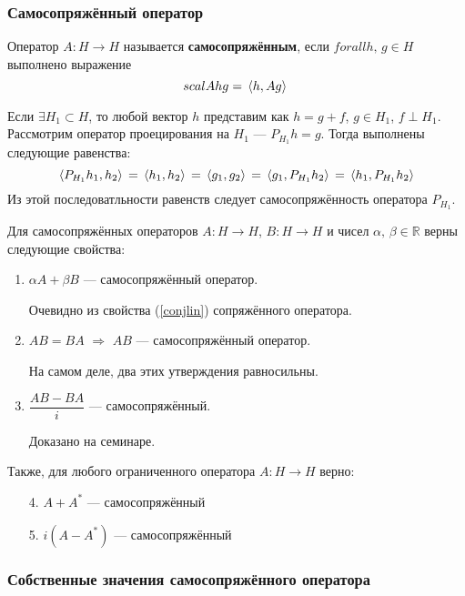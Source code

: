 \documentclass[12pt]{article}
\begin{document}
	\subsubsection{Самосопряжённый оператор}
	
	\begin{defi}
		Оператор $A : H \rightarrow H$ называется \textbf{самосопряжённым}, если $forall h,\, g \in H$ выполнено выражение
		$$scal{Ah}{g} = \, \langle h, Ag \rangle \,$$
	\end{defi}
	
	\example Если $\exists H_1 \subset H$, то любой вектор $h$ представим как $h = g+f$, $g \in H_1$, $f\perp H_1$.
	Рассмотрим оператор проецирования на $H_1$ --- $P_{H_1}h = g$. Тогда выполнены следующие равенства:
	$$\, \langle P_{H_1}h_1, h_2 \rangle \, = \, \langle h_1, h_2 \rangle \, = \, \langle g_1, g_2 \rangle \, = \, \langle g_1, P_{H_1}h_2 \rangle \, = \, \langle h_1, P_{H_1}h_2 \rangle \,$$
	Из этой последоватльности равенств следует самосопряжённость оператора $P_{H_1}$.
	
	Для самосопряжённых операторов $A : H \rightarrow H$, $B : H \rightarrow H$ и чисел $\alpha,\, \beta \in \mathbb{R}$ верны следующие
	свойства:
	\begin{enumerate}
		\item $\alpha A + \beta B$ --- самосопряжённый оператор.

		Очевидно из свойства (\ref{conjlin}) сопряжённого оператора.
		
		\item $AB = BA$ $\Rightarrow$ $AB$ --- самосопряжённый оператор.
		

		На самом деле, два этих утверждения равносильны.
		
		\item $\dfrac{AB - BA}{i}$ --- самосопряжённый.
		
		{\color{gray}
		Доказано на семинаре.
		}
	\end{enumerate}
	Также, для любого ограниченного оператора $A: H \rightarrow H$ верно:
	\begin{enumerate}
		\item[4.] $A+A^{*}$ --- самосопряжённый
		\item[5.] $i(A-A^{*})$ --- самосопряжённый
	\end{enumerate}
	
	\subsubsection{Собственные значения самосопряжённого оператора}
	
\end{document}
